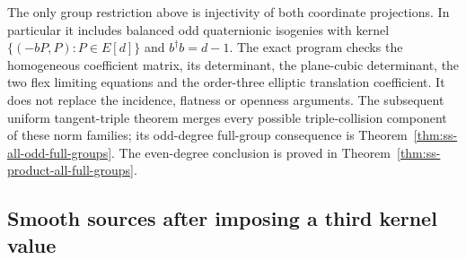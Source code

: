 \begin{remark}\label{auto:A_monodromy:c25cfd1730a5}

The only group restriction above is injectivity of both coordinate
projections. In particular it includes balanced odd quaternionic
isogenies with kernel $\{(-bP,P):P\in E[d]\}$ and
$b^\dagger b=d-1$. The exact program
checks the homogeneous coefficient matrix, its determinant, the
plane-cubic determinant, the two flex limiting equations and the
order-three elliptic translation coefficient. It does not replace
the incidence, flatness or openness arguments. The subsequent uniform
tangent-triple theorem merges every possible triple-collision component
of these norm families; its odd-degree full-group consequence is
Theorem~\ref{thm:ss-all-odd-full-groups}. The even-degree conclusion is proved in
Theorem~\ref{thm:ss-product-all-full-groups}.
\end{remark}


\subsection{Smooth sources after imposing a third kernel value}
\label{sec:DE-A4-contact-third-value}

